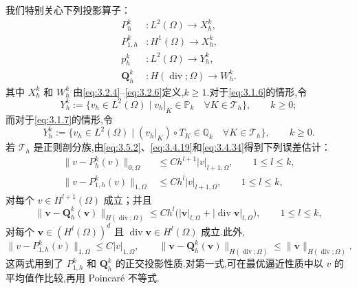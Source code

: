 我们特别关心下列投影算子：
\begin{align}
  P_h^k&\colon L^2(\Omega)\to X_h^k,\label{eq:3.5.3}\\
  P_{1,h}^k&\colon H^1(\Omega)\to X_h^k,\label{eq:3.5.4}\\
  p_h^k&\colon L^2(\Omega)\to Y_h^k,\label{eq:3.5.5}\\
  \boldsymbol{Q}_h^k&\colon H(\operatorname{div};\Omega)\to W_h^k.\label{eq:3.5.6}
\end{align}
其中 \(X_h^k\) 和 \(W_h^k\) 由\eqref{eq:3.2.4}–\eqref{eq:3.2.6}定义,\(k\ge1\).对于\eqref{eq:3.1.6}的情形,令
\begin{equation}\label{eq:3.5.7}
  Y_h^k:=\{v_h\in L^2(\Omega)\mid v_h|_K\in\mathbb P_k\quad\forall K\in\mathcal T_h\},
    \qquad k\ge0;
\end{equation}
而对于\eqref{eq:3.1.7}的情形,令
\begin{equation}\label{eq:3.5.8}
  Y_h^k:=\{v_h\in L^2(\Omega)\mid(v_h|_K)\circ T_K\in\mathbb Q_k
     \quad\forall K\in\mathcal T_h\},\qquad k\ge0.
\end{equation}
若 \(\mathcal T_h\) 是正则剖分族,由\eqref{eq:3.5.2}、\eqref{eq:3.4.19}和\eqref{eq:3.4.34}得到下列误差估计：
\begin{align}
  \|v-P_h^k(v)\|_{0,\Omega}&\le Ch^{l+1}|v|_{l+1,\Omega},\qquad 1\le l\le k,\label{eq:3.5.9}\\
  \|v-P_{1,h}^k(v)\|_{1,\Omega}&\le Ch^l|v|_{l+1,\Omega},\qquad 1\le l\le k,\label{eq:3.5.10}
\end{align}
对每个 \(v\in H^{l+1}(\Omega)\) 成立；并且
\begin{equation}\label{eq:3.5.11}
  \|\boldsymbol{v}-\boldsymbol{Q}_h^k(\boldsymbol{v})\|_{H(\operatorname{div};\Omega)}
  \le Ch^l\bigl(|\boldsymbol{v}|_{l,\Omega}+|\operatorname{div}\boldsymbol{v}|_{l,\Omega}\bigr),
  \qquad 1\le l\le k,
\end{equation}
对每个 \(\boldsymbol{v}\in(H^l(\Omega))^d\) 且 \(\operatorname{div}\boldsymbol{v}\in H^l(\Omega)\) 成立.此外,
\begin{equation}\label{eq:3.5.12}
  \|v-P_{1,h}^k(v)\|_{1,\Omega}\le C|v|_{1,\Omega},\qquad
  \|\boldsymbol{v}-\boldsymbol{Q}_h^k(\boldsymbol{v})\|_{H(\operatorname{div};\Omega)}
  \le\|\boldsymbol{v}\|_{H(\operatorname{div};\Omega)}.
\end{equation}
这两式用到了 \(P_{1,h}^k\) 和 \(\boldsymbol{Q}_h^k\) 的正交投影性质.对第一式,可在最优逼近性质中以 \(v\) 的平均值作比较,再用 Poincaré 不等式.

